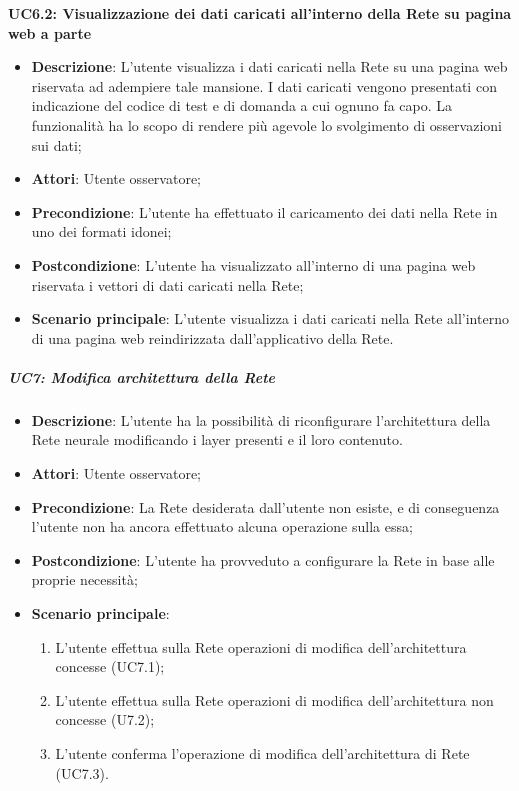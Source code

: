 \textbf{UC6.2: Visualizzazione dei dati caricati all'interno della Rete su pagina web a parte}\mbox{}
\label{UC6.2: Visualizzazione dei dati caricati all'interno della Rete su pagina web a parte}
\noindent
\begin{itemize}
\item \textbf{Descrizione}: L'utente visualizza i dati caricati nella Rete su una pagina web riservata ad adempiere tale mansione. I dati caricati vengono presentati con indicazione del codice di test e di domanda a cui ognuno fa capo. La funzionalit\`a ha lo scopo di rendere pi\`u agevole lo svolgimento di osservazioni sui dati;
\item \textbf{Attori}: Utente osservatore;
\item \textbf{Precondizione}: L'utente ha  effettuato il caricamento dei dati nella Rete in uno dei formati idonei;
\item \textbf{Postcondizione}: L'utente ha visualizzato all'interno di una pagina web riservata i vettori di dati caricati nella Rete;
\item \textbf{Scenario principale}: L'utente visualizza i dati caricati nella Rete all'interno di una pagina web reindirizzata dall'applicativo della Rete.
\end{itemize}

\subparagraph{UC7: Modifica architettura della Rete}\mbox{}
\label{UC7: Modifica architettura della Rete}
\noindent
\begin{itemize}
\item \textbf{Descrizione}: L'utente ha la possibilit\`a di riconfigurare l'architettura della Rete neurale modificando i layer presenti e il loro contenuto.
\item \textbf{Attori}: Utente osservatore;
\item \textbf{Precondizione}: La Rete desiderata dall'utente non esiste, e di conseguenza l'utente non ha ancora effettuato alcuna operazione sulla essa;
\item \textbf{Postcondizione}: L'utente ha provveduto a configurare la Rete in base alle proprie necessit\`a;
\item \textbf{Scenario principale}:
\begin{enumerate}
\item L'utente effettua sulla Rete operazioni di modifica dell'architettura concesse (UC7.1);
\item L'utente effettua sulla Rete operazioni di modifica dell'architettura non concesse (U7.2);
\item L'utente conferma l'operazione di modifica dell'architettura di Rete (UC7.3).
\end{enumerate}
\end{itemize}

